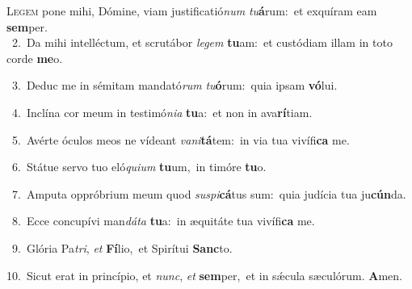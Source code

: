 \lettrine{\initial\textcolor{\initialcolor}{L}}{egem} pone mihi, Dómine, viam justificatió\textit{num} \textit{tu}\-\textbf{á}rum:~\star et exquíram eam \textbf{sem}\-per.\\
{\numbfont\textcolor{\numbcolor}{~2.}}~Da mihi intelléctum, et scrutábor \textit{le}\-\textit{gem} \textbf{tu}\-am:~\star et custódiam illam in toto corde \textbf{me}\-o.\par
{\numbfont\textcolor{\numbcolor}{~3.}}~Deduc me in sémitam mandató\textit{rum} \textit{tu}\-\textbf{ó}rum:~\star quia ipsam \textbf{vó}\-lui.\par
{\numbfont\textcolor{\numbcolor}{~4.}}~Inclína cor meum in testimó\-\textit{ni}\-\textit{a} \textbf{tu}\-a:~\star et non in ava\-\textbf{rí}\-tiam.\par
{\numbfont\textcolor{\numbcolor}{~5.}}~Avérte óculos meos ne vídeant \textit{va}\-\textit{ni}\textbf{tá}tem:~\star in via tua vivífi\textbf{ca} me.\par
{\numbfont\textcolor{\numbcolor}{~6.}}~Státue servo tuo eló\-\textit{qui}\-\textit{um} \textbf{tu}\-um,~\star in timóre \textbf{tu}\-o.\par
{\numbfont\textcolor{\numbcolor}{~7.}}~Amputa oppróbrium meum quod \textit{su}\-\textit{spi}\textbf{cá}tus sum:~\star quia judícia tua ju\-\textbf{cún}\-da.\par
{\numbfont\textcolor{\numbcolor}{~8.}}~Ecce concupívi man\-\textit{dá}\-\textit{ta} \textbf{tu}\-a:~\star in æquitáte tua vivífi\textbf{ca} me.\par
{\numbfont\textcolor{\numbcolor}{~9.}}~Glória Pa\-\textit{tri}\-, \textit{et} \textbf{Fí}\-lio,~\star et Spirítui \textbf{Sanc}\-to.\par
{\numbfont\textcolor{\numbcolor}{10.}}~Sicut erat in princípio, et \textit{nunc}\-, \textit{et} \textbf{sem}\-per,~\star et in sǽcula sæculórum. \textbf{A}\-men.\par
